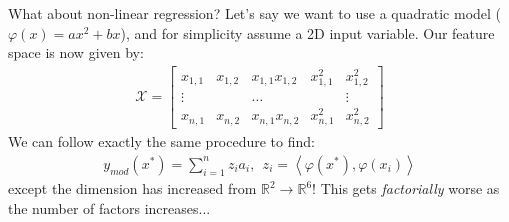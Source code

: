 

What about non-linear regression?\pause{} Let's say we want to use a quadratic model ($\varphi(x)=ax^2 +bx$), and for simplicity assume a 2D input variable. Our feature space is now given by:
\begin{align*}
\mathcal{X} = \begin{bmatrix} x_{1,1}& x_{1,2} & x_{1,1}x_{1,2} & x_{1,1}^2 & x_{1,2}^2    \\ 
\vdots  &&\hdots && \vdots \\
 x_{n,1}& x_{n,2} & x_{n,1}x_{n,2} & x_{n,1}^2 & x_{n,2}^2  
\end{bmatrix}
\end{align*}
\pause{}
We can follow exactly the same procedure to find:
\begin{align*}
y_{mod}(x^*) =\sum_{i=1}^{n} z_i a_i,\: \: z_i =  \left\langle \varphi(x^*),\varphi(x_i) \right\rangle  
\end{align*}
\pause{}
except the dimension has increased from $\mathbb{R}^2 \rightarrow \mathbb{R}^{6}$! This gets \emph{factorially} worse as the number of factors increases...
